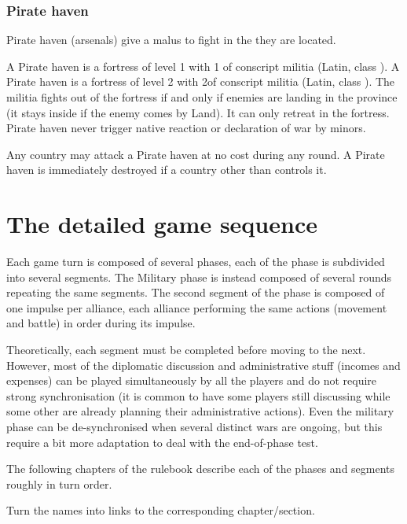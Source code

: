 \subsubsection{Pirate haven}
\aparag[Effects] Pirate haven (arsenals) give a malus to fight 
\corsaire in the \CTZ they are located.

\aparag[Military] A Pirate haven \Facemoins is a fortress of level 1 with 1\LD
of conscript militia (Latin, class \CAIII).
\bparag A Pirate haven \Faceplus is a fortress of level 2 with 2\LD of
conscript militia (Latin, class \CAIII).
\bparag The militia fights out of the fortress if and only if enemies are
landing in the province (it stays inside if the enemy comes by Land). It can
only retreat in the fortress.
\bparag Pirate haven never trigger native reaction or declaration of war by
\ROTW minors.

\aparag[Destruction] Any country may attack a Pirate haven at no cost during
any round.
\bparag A Pirate haven is immediately destroyed if a country other than
 controls it.

\clearpage




\section{The detailed game sequence}

\aparag Each game turn is composed of several phases, each of the phase is
subdivided into several segments.
\bparag The Military phase is instead composed of several rounds repeating the
same segments. The second segment of the phase is composed of one impulse per
alliance, each alliance performing the same actions (movement and battle) in
order during its impulse.

\aparag Theoretically, each segment must be completed before moving to the
next.
\bparag However, most of the diplomatic discussion and administrative stuff
(incomes and expenses) can be played simultaneously by all the players and do
not require strong synchronisation (it is common to have some players still
discussing while some other are already planning their administrative
actions).
\bparag Even the military phase can be de-synchronised when several distinct
wars are ongoing, but this require a bit more adaptation to deal with the
end-of-phase test.

\begin{designnote}
  The following chapters of the rulebook describe each of the phases and
  segments roughly in turn order.
\end{designnote}

\begin{todo}
  Turn the names into links to the corresponding chapter/section.
\end{todo}

\begin{multicols}{2}
  \GameSequence
\end{multicols}


